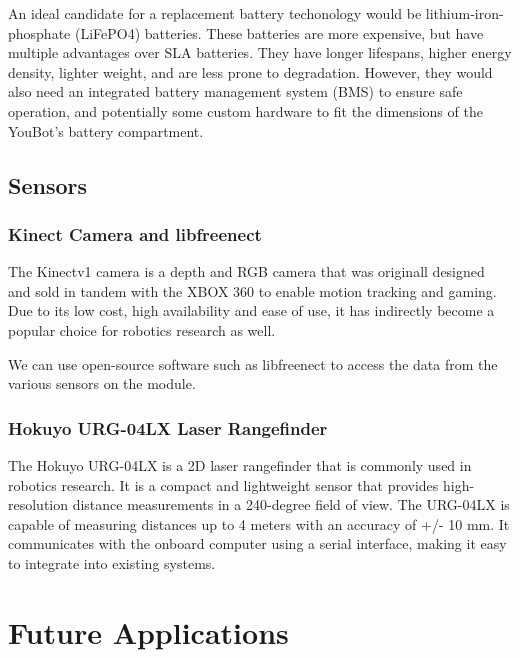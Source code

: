 \documentclass[a4paper, 12pt]{article}
\newif\ifshownotes
\newcommand{\notes}[1]{\ifshownotes\textcolor{blue}{#1}\fi}
\begin{document}
    An ideal candidate for a replacement battery techonology would be lithium-iron-phosphate (LiFePO4) batteries. These batteries are more expensive, but have multiple advantages over SLA batteries. They have longer lifespans, higher energy density, lighter weight, and are less prone to degradation. However, they would also need an integrated battery management system (BMS) to ensure safe operation, and potentially some custom hardware to fit the dimensions of the YouBot's battery compartment. 


    
    \subsection{Sensors}
    \subsubsection{Kinect Camera and libfreenect}

    The Kinectv1 camera is a depth and RGB camera that was originall designed and sold in tandem with the XBOX 360 to enable motion tracking and gaming. Due to its low cost, high availability and ease of use, it has indirectly become a popular choice for robotics research as well. 

    We can use open-source software such as libfreenect to access the data from the various sensors on the module.


    \notes{discuss the libfreenect library, how to install it, and how it could be used within ROS.}


    \subsubsection{Hokuyo URG-04LX Laser Rangefinder}

    The Hokuyo URG-04LX is a 2D laser rangefinder that is commonly used in robotics research. It is a compact and lightweight sensor that provides high-resolution distance measurements in a 240-degree field of view. The URG-04LX is capable of measuring distances up to 4 meters with an accuracy of +/- 10 mm. It communicates with the onboard computer using a serial interface, making it easy to integrate into existing systems.

    \notes{discuss installing the drivers and whatnot, and how to use it within ROS and rqt.}

    \pagebreak

    \section{Future Applications}
\end{document}
